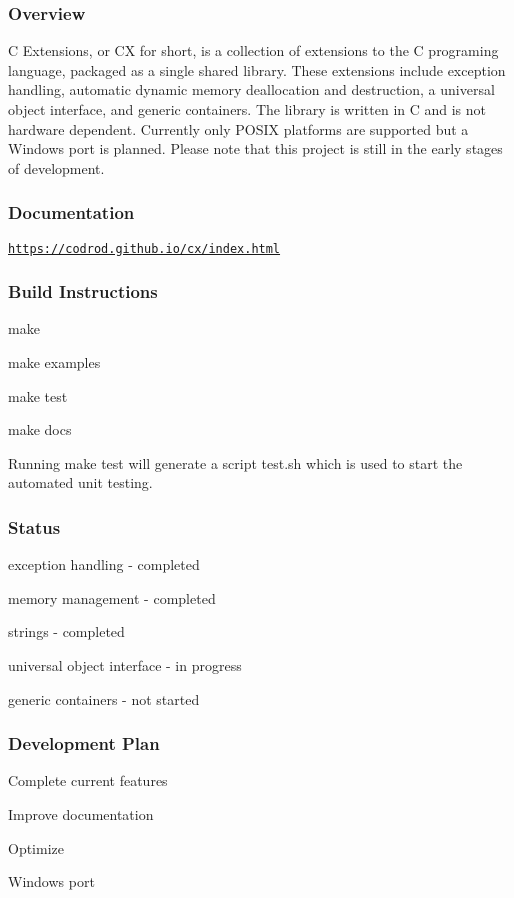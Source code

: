 \subsubsection*{Overview}

C Extensions, or CX for short, is a collection of extensions to the C programing language, packaged as a single shared library. These extensions include exception handling, automatic dynamic memory deallocation and destruction, a universal object interface, and generic containers. The library is written in C and is not hardware dependent. Currently only P\+O\+S\+IX platforms are supported but a Windows port is planned. Please note that this project is still in the early stages of development.

\subsubsection*{Documentation}

\href{https://codrod.github.io/cx/index.html}{\tt https\+://codrod.\+github.\+io/cx/index.\+html}

\subsubsection*{Build Instructions}


\begin{DoxyItemize}
\item make
\item make examples
\item make test
\item make docs
\end{DoxyItemize}

Running \textquotesingle{}make test\textquotesingle{} will generate a script \textquotesingle{}test.\+sh\textquotesingle{} which is used to start the automated unit testing.

\subsubsection*{Status}


\begin{DoxyItemize}
\item exception handling -\/ completed
\item memory management -\/ completed
\item strings -\/ completed
\item universal object interface -\/ in progress
\item generic containers -\/ not started
\end{DoxyItemize}

\subsubsection*{Development Plan}


\begin{DoxyEnumerate}
\item Complete current features
\item Improve documentation
\item Optimize
\item Windows port 
\end{DoxyEnumerate}